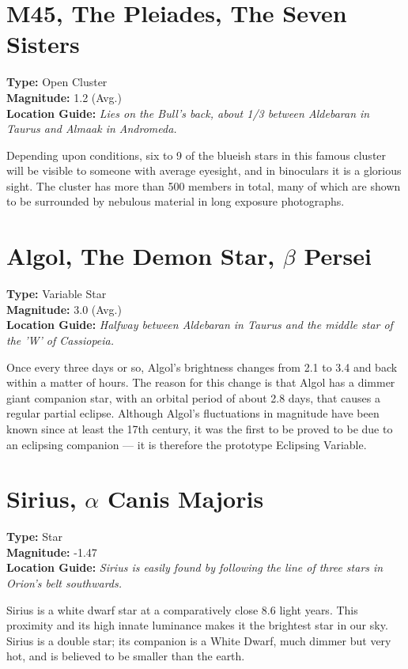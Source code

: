 \section{M45, The Pleiades, The Seven Sisters}
\textbf{Type:} Open Cluster \\
\textbf{Magnitude:} 1.2 (Avg.) \\
\textbf{Location Guide:} \textit{Lies on the Bull's back, about 1/3 between Aldebaran in Taurus and Almaak in Andromeda.} 

Depending upon conditions, six to 9 of the blueish stars in this
famous cluster will be visible to someone with average eyesight, and in
binoculars it is a glorious sight. The cluster has more than 500
members in total, many of which are shown to be surrounded by nebulous
material in long exposure photographs.

\section{Algol, The Demon Star, $\beta$ Persei}
\textbf{Type:} Variable Star \\
\textbf{Magnitude:} 3.0 (Avg.) \\
\textbf{Location Guide:} \textit{Halfway between Aldebaran in Taurus and the middle star of the 'W' of Cassiopeia.}

Once every three days or so, Algol's brightness changes from 2.1 to 3.4
and back within a matter of hours. The reason for this change is that
Algol has a dimmer giant companion star, with an orbital period of
about 2.8 days, that causes a regular partial eclipse. Although
Algol's fluctuations in magnitude have been known since at least the
17th century, it was the first to be proved to be due to an eclipsing
companion --- it is therefore the prototype Eclipsing Variable.

\section{Sirius, $\alpha$ Canis Majoris}
\textbf{Type:} Star \\
\textbf{Magnitude:} -1.47 \\
\textbf{Location Guide:} \textit{Sirius is easily found by following the line of three stars in Orion's belt southwards.} 

Sirius is a white dwarf star at a comparatively close 8.6 light
years. This proximity and its high innate luminance makes it the
brightest star in our sky. Sirius is a double star; its companion is a White Dwarf, 
much dimmer but very hot, and is believed to be smaller than the earth.

